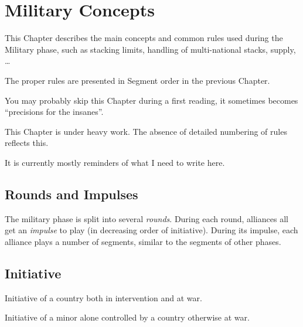 
\chapter{Military Concepts}\label{chapter:MilitaryConcepts}

\begin{designnote}
  This Chapter describes the main concepts and common rules used
  during the Military phase, such as stacking limits, handling of
  multi-national stacks, supply, \ldots

  The proper rules are presented in Segment order in the previous
  Chapter.

  You may probably skip this Chapter during a first reading, it sometimes
  becomes ``precisions for the insanes''.
\end{designnote}

\begin{todo}
  This Chapter is under heavy work. The absence of detailed numbering of rules
  reflects this.

  It is currently mostly reminders of what I need to write here.
\end{todo}

\section{Rounds and Impulses}
The military phase is split into several \emph{rounds}. During each round,
alliances all get an \emph{impulse} to play (in decreasing order of
initiative). During its impulse, each alliance plays a number of segments,
similar to the segments of other phases.

\section{Initiative}
Initiative of a country both in intervention and at war.

Initiative of a minor alone controlled by a country otherwise at war.

